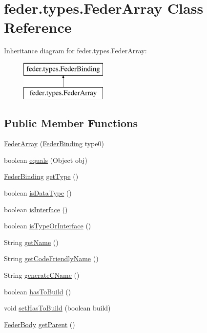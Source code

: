 \hypertarget{classfeder_1_1types_1_1FederArray}{}\section{feder.\+types.\+Feder\+Array Class Reference}
\label{classfeder_1_1types_1_1FederArray}
Inheritance diagram for feder.\+types.\+Feder\+Array\+:\begin{figure}[H]
\begin{center}
\leavevmode
\includegraphics[height=2.000000cm]{classfeder_1_1types_1_1FederArray}
\end{center}
\end{figure}
\subsection*{Public Member Functions}
\begin{DoxyCompactItemize}
\item 
\hyperlink{classfeder_1_1types_1_1FederArray_a0f799437788cc7f8d6beff53667fda6f}{Feder\+Array} (\hyperlink{classfeder_1_1types_1_1FederBinding}{Feder\+Binding} type0)
\item 
boolean \hyperlink{classfeder_1_1types_1_1FederArray_ac6c0b3642d82efecc34be9a73c8447e8}{equals} (Object obj)
\item 
\hyperlink{classfeder_1_1types_1_1FederBinding}{Feder\+Binding} \hyperlink{classfeder_1_1types_1_1FederArray_ae4d5fffefb7cf173ed04a86b4a6c2de0}{get\+Type} ()
\item 
boolean \hyperlink{classfeder_1_1types_1_1FederArray_a62acbf35378415cb9b78823d18d74f59}{is\+Data\+Type} ()
\item 
boolean \hyperlink{classfeder_1_1types_1_1FederArray_a82c7357547d398c09c2437b9bbaedf24}{is\+Interface} ()
\item 
boolean \hyperlink{classfeder_1_1types_1_1FederArray_a2defe214b433edc0169246e2f028c3fc}{is\+Type\+Or\+Interface} ()
\item 
String \hyperlink{classfeder_1_1types_1_1FederArray_a3a03529799560dd4453a2c7091ea6337}{get\+Name} ()
\item 
String \hyperlink{classfeder_1_1types_1_1FederArray_a4928bd58e0ec5c07efdff1ebcef528ff}{get\+Code\+Friendly\+Name} ()
\item 
String \hyperlink{classfeder_1_1types_1_1FederArray_a3a90e3bd9b639374158bc5fd717c824b}{generate\+C\+Name} ()
\item 
boolean \hyperlink{classfeder_1_1types_1_1FederArray_a342cc0011064b863d9524bc90c478ee6}{has\+To\+Build} ()
\item 
void \hyperlink{classfeder_1_1types_1_1FederArray_a44cbed29acf49dde8b64bcc05d3d6943}{set\+Has\+To\+Build} (boolean build)
\item 
\hyperlink{classfeder_1_1types_1_1FederBody}{Feder\+Body} \hyperlink{classfeder_1_1types_1_1FederArray_a1b547ac37dd2072afb7bd7360342f1f1}{get\+Parent} ()
\end{DoxyCompactItemize}

